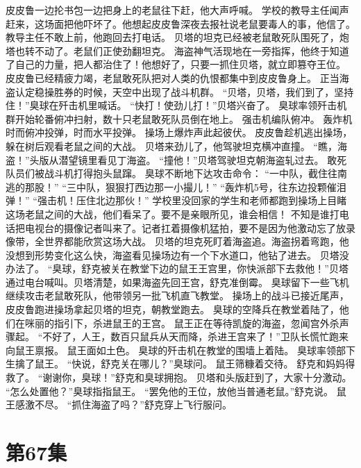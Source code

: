 \documentclass[a4paper,12pt,UTF8,twoside]{ctexbook}
\begin{document}
        皮皮鲁一边抡书包一边把身上的老鼠往下赶，他大声呼喊。 
        学校的教导主任闻声赶来，这场面把他吓坏了。他想起皮皮鲁深夜去报社说老鼠要毒人的事，他信了。 
        教导主任不敢上前，他跑回去打电话。 
        贝塔的坦克已经被老鼠敢死队围死了，炮塔也转不动了。老鼠们正使劲翻坦克。 
        海盗神气活现地在一旁指挥，他终于知道了自己的力量，把人都治住了！他想好了，只要一抓住贝塔，就立即篡夺王位。 
        皮皮鲁已经精疲力竭，老鼠敢死队把对人类的仇恨都集中到皮皮鲁身上。 
        正当海盗认定稳操胜券的时候，天空中出现了战斗机群。 
        “贝塔，贝塔，我们到了，坚持住！”臭球在歼击机里喊话。 
        “快打！使劲儿打！”贝塔兴奋了。 
        臭球率领歼击机群开始轮番俯冲扫射，数十只老鼠敢死队员倒在地上。 
        强击机编队俯冲。 
        轰炸机时而俯冲投弹，时而水平投弹。 
        操场上爆炸声此起彼伏。 
        皮皮鲁趁机逃出操场，躲在树后观看老鼠之间的大战。 
        贝塔来劲儿了，他驾驶坦克横冲直撞。 
        “瞧，海盗！”头版从潜望镜里看见丁海盗。 
        “撞他！”贝塔驾驶坦克朝海盗轧过去。 
        敢死队员们被战斗机打得抱头鼠蹿。 
        臭球不断地下达攻击命令： 
        “一中队，截住往南逃的那股！” 
        “三中队，狠狠打西边那一小撮儿！” 
        “轰炸机5号，往东边投颗催泪弹！” 
        “强击机！压住北边那伙！” 
        学校里没回家的学生和老师都跑到操场上目睹这场老鼠之间的大战，他们看呆了。要不是亲眼所见，谁会相信！ 
        不知是谁打电话把电视台的摄像记者叫来了。记者扛着摄像机猛拍，要不是因为他激动忘了放录像带，全世界都能欣赏这场大战。 
        贝塔的坦克死盯着海盗追。海盗拐着弯跑，他没想到形势变化这么快，海盗看见操场边有一个下水道口，他钻了进去。 
        贝塔没办法了。 
        “臭球，舒克被关在教堂下边的鼠王王宫里，你快派部下去救他！”贝塔通过电台喊叫。贝塔清楚，如果海盗先回王宫，舒克准倒霉。 
        臭球留下一些飞机继续攻击老鼠敢死队，他带领另一批飞机直飞教堂。 
        操场上的战斗已接近尾声，皮皮鲁跑进操场拿起贝塔的坦克，朝教堂跑去。 
        臭球的空降兵在教堂着陆了，他们在咪丽的指引下，杀进鼠王的王宫。 
        鼠王正在等待凯旋的海盗，忽闻宫外杀声骤起。 
        “不好了，人王，数百只鼠兵从天而降，杀进王宫来了！”卫队长慌忙跑来向鼠王禀报。 
        鼠王面如土色。 
        臭球的歼击机在教堂的围墙上着陆。 
        臭球率领部下生擒了鼠王。 
        “快说，舒克关在哪儿？”臭球问。 
        鼠王筛糠着交待。 
        舒克和妈妈得救了。 
        “谢谢你，臭球！”舒克和臭球拥抱。 
        贝塔和头版赶到了，大家十分激动。 
        “怎么处置他？”臭球指指鼠王。 
        “罢免他的王位，放他当普通老鼠。”舒克说。 
        鼠王感激不尽。 
        “抓住海盗了吗？”舒克穿上飞行服问。   \chapter{第67集} 
\end{document}
